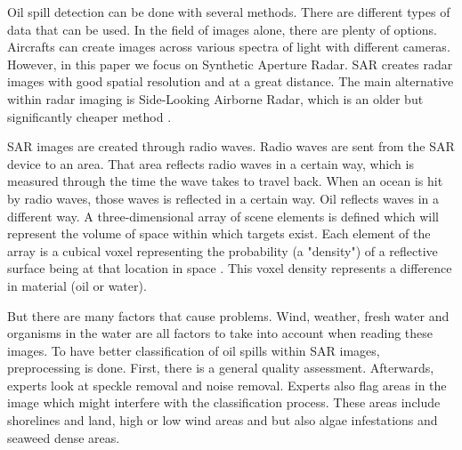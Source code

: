 \hspace{0.5cm} Oil spill detection can be done with several methods. There are different types of data that can be used. In the field of images alone, there are plenty of options. Aircrafts can create images across various spectra of light with different cameras. However, in this paper we focus on Synthetic Aperture Radar. SAR creates radar images with good spatial resolution and at a great distance. The main alternative within radar imaging is Side-Looking Airborne Radar, which is an older but significantly cheaper method \cite{fingas2014review}. 

SAR images are created through radio waves. Radio waves are sent from the SAR device to an area. That area reflects radio waves in a certain way, which is measured through the time the wave takes to travel back. When an ocean is hit by radio waves, those waves is reflected in a certain way. Oil reflects waves in a different way. A three-dimensional array of scene elements is defined which will represent the volume of space within which targets exist. Each element of the array is a cubical voxel representing the probability (a "density") of a reflective surface being at that location in space \cite{wikireplacethis}. This voxel density represents a difference in material (oil or water).

But there are many factors that cause problems. Wind, weather, fresh water and organisms in the water are all factors to take into account when reading these images. To have better classification of oil spills within SAR images, preprocessing is done. First, there is a general quality assessment. Afterwards, experts look at speckle removal and noise removal\cite{Keramitsoglou2004}. Experts also flag areas in the image which might interfere with the classification process. These areas include shorelines and land, high or low wind areas and but also algae infestations and seaweed dense areas\cite{fingas2014review}.



